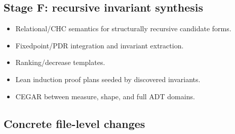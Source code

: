 \documentclass[11pt,oneside]{article}
\begin{document}
\subsection{Stage F: recursive invariant synthesis}

\begin{itemize}
  \item Relational/CHC semantics for structurally recursive candidate forms.
  \item Fixedpoint/PDR integration and invariant extraction.
  \item Ranking/decrease templates.
  \item Lean induction proof plans seeded by discovered invariants.
  \item CEGAR between measure, shape, and full ADT domains.
\end{itemize}

\subsection{Concrete file-level changes}
\end{document}
